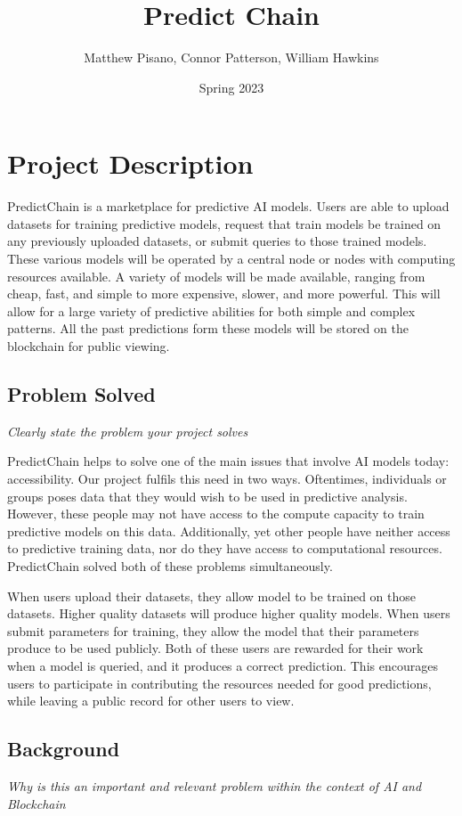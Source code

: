 \documentclass{article}
\title{Predict Chain}
\author{Matthew Pisano, Connor Patterson, William Hawkins}
\date{Spring 2023}
\begin{document}
\maketitle

\section{Project Description}

PredictChain is a marketplace for predictive AI models. Users are able to upload datasets for training predictive models,
request that train models be trained on any previously uploaded datasets, or submit queries to those trained models.
These various models will be operated by a central node or nodes with computing resources available. A variety of
models will be made available, ranging from cheap, fast, and simple to more expensive, slower, and more powerful.
This will allow for a large variety of predictive abilities for both simple and complex patterns.  All the past predictions
form these models will be stored on the blockchain for public viewing.

\subsection{Problem Solved}
\emph{Clearly state the problem your project solves}

PredictChain helps to solve one of the main issues that involve AI models today: accessibility.  Our project fulfils this
need in two ways.  Oftentimes, individuals or groups poses data that they would wish to be used in predictive analysis.
However, these people may not have access to the compute capacity to train predictive models on this data.  Additionally,
yet other people have neither access to predictive training data, nor do they have access to computational resources.
PredictChain solved both of these problems simultaneously.

When users upload their datasets, they allow model to be trained on those datasets.  Higher quality datasets will produce
higher quality models.  When users submit parameters for training, they allow the model that their parameters produce to
be used publicly.  Both of these users are rewarded for their work when a model is queried, and it produces a correct prediction.
This encourages users to participate in contributing the resources needed for good predictions, while leaving a public
record for other users to view.

\subsection{Background}
\emph{Why is this an important and relevant problem within the context of AI and Blockchain}
\end{document}
